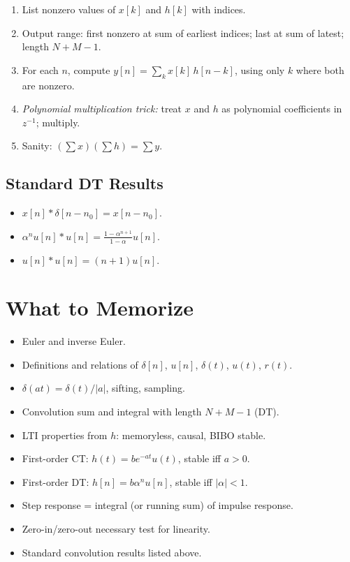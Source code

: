 \documentclass[11pt]{article}
\begin{document}
\begin{enumerate}
    \item List nonzero values of $x[k]$ and $h[k]$ with indices.
    \item Output range: first nonzero at sum of earliest indices; last at sum of latest; length $N+M-1$.
    \item For each $n$, compute $y[n] = \sum_k x[k]\,h[n-k]$, using only $k$ where both are nonzero.
    \item \emph{Polynomial multiplication trick:} treat $x$ and $h$ as polynomial coefficients in $z^{-1}$; multiply.
    \item Sanity: $(\sum x)(\sum h) = \sum y$.
\end{enumerate}

\subsection*{Standard DT Results}
\begin{itemize}[leftmargin=*]
    \item $x[n]*\delta[n-n_0] = x[n-n_0]$.
    \item $\alpha^n u[n] * u[n] = \tfrac{1-\alpha^{n+1}}{1-\alpha}u[n]$.
    \item $u[n] * u[n] = (n+1)u[n]$.
\end{itemize}

\section{What to Memorize}

\begin{itemize}[leftmargin=*]
    \item Euler and inverse Euler.
    \item Definitions and relations of $\delta[n]$, $u[n]$, $\delta(t)$, $u(t)$, $r(t)$.
    \item $\delta(at) = \delta(t)/|a|$, sifting, sampling.
    \item Convolution sum and integral with length $N+M-1$ (DT).
    \item LTI properties from $h$: memoryless, causal, BIBO stable.
    \item First-order CT: $h(t) = be^{-at}u(t)$, stable iff $a>0$.
    \item First-order DT: $h[n] = b\alpha^n u[n]$, stable iff $|\alpha|<1$.
    \item Step response = integral (or running sum) of impulse response.
    \item Zero-in/zero-out necessary test for linearity.
    \item Standard convolution results listed above.
\end{itemize}
\end{document}
